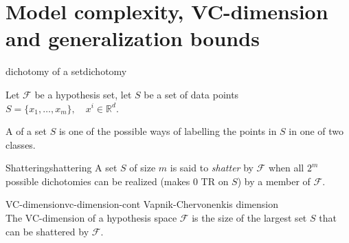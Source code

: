 \section[Model complexity]{Model complexity, VC-dimension and generalization bounds}

\begin{definition}{dichotomy of a set}{dichotomy}

	Let $\mathcal{F}$ be a hypothesis set, let $S$ be a set of data points $S =
		\{x_1, \ldots, x_m\},\quad x^i \in \mathds{R}^d$.

	A  of a set
	$S$ is one of the possible ways of labelling the points in $S$ in
	one of two classes.

\end{definition}

\begin{definition}{Shattering}{shattering}
	A set $S$ of size $m$ is said to \emph{shatter} by $\mathcal{F}$
	when all $2^m$ possible dichotomies can be realized (makes 0 TR on $S$)
	by a member of
	$\mathcal{F}$.
\end{definition}

\begin{definition}{VC-dimension}{vc-dimension-cont}
	Vapnik-Chervonenkis dimension \\[1em]
	The VC-dimension of a hypothesis space $\mathcal{F}$ is the size
	of the largest set $S$ that can be shattered by $\mathcal{F}$.
\end{definition}

